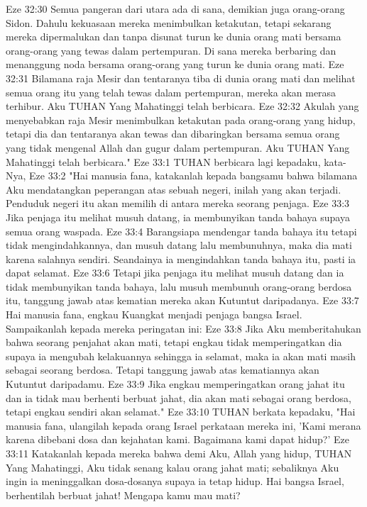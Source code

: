 Eze 32:30  Semua pangeran dari utara ada di sana, demikian juga orang-orang Sidon. Dahulu kekuasaan mereka menimbulkan ketakutan, tetapi sekarang mereka dipermalukan dan tanpa disunat turun ke dunia orang mati bersama orang-orang yang tewas dalam pertempuran. Di sana mereka berbaring dan menanggung noda bersama orang-orang yang turun ke dunia orang mati.
Eze 32:31  Bilamana raja Mesir dan tentaranya tiba di dunia orang mati dan melihat semua orang itu yang telah tewas dalam pertempuran, mereka akan merasa terhibur. Aku TUHAN Yang Mahatinggi telah berbicara.
Eze 32:32  Akulah yang menyebabkan raja Mesir menimbulkan ketakutan pada orang-orang yang hidup, tetapi dia dan tentaranya akan tewas dan dibaringkan bersama semua orang yang tidak mengenal Allah dan gugur dalam pertempuran. Aku TUHAN Yang Mahatinggi telah berbicara."
Eze 33:1  TUHAN berbicara lagi kepadaku, kata-Nya,
Eze 33:2  "Hai manusia fana, katakanlah kepada bangsamu bahwa bilamana Aku mendatangkan peperangan atas sebuah negeri, inilah yang akan terjadi. Penduduk negeri itu akan memilih di antara mereka seorang penjaga.
Eze 33:3  Jika penjaga itu melihat musuh datang, ia membunyikan tanda bahaya supaya semua orang waspada.
Eze 33:4  Barangsiapa mendengar tanda bahaya itu tetapi tidak mengindahkannya, dan musuh datang lalu membunuhnya, maka dia mati karena salahnya sendiri. Seandainya ia mengindahkan tanda bahaya itu, pasti ia dapat selamat.
Eze 33:6  Tetapi jika penjaga itu melihat musuh datang dan ia tidak membunyikan tanda bahaya, lalu musuh membunuh orang-orang berdosa itu, tanggung jawab atas kematian mereka akan Kutuntut daripadanya.
Eze 33:7  Hai manusia fana, engkau Kuangkat menjadi penjaga bangsa Israel. Sampaikanlah kepada mereka peringatan ini:
Eze 33:8  Jika Aku memberitahukan bahwa seorang penjahat akan mati, tetapi engkau tidak memperingatkan dia supaya ia mengubah kelakuannya sehingga ia selamat, maka ia akan mati masih sebagai seorang berdosa. Tetapi tanggung jawab atas kematiannya akan Kutuntut daripadamu.
Eze 33:9  Jika engkau memperingatkan orang jahat itu dan ia tidak mau berhenti berbuat jahat, dia akan mati sebagai orang berdosa, tetapi engkau sendiri akan selamat."
Eze 33:10  TUHAN berkata kepadaku, "Hai manusia fana, ulangilah kepada orang Israel perkataan mereka ini, 'Kami merana karena dibebani dosa dan kejahatan kami. Bagaimana kami dapat hidup?'
Eze 33:11  Katakanlah kepada mereka bahwa demi Aku, Allah yang hidup, TUHAN Yang Mahatinggi, Aku tidak senang kalau orang jahat mati; sebaliknya Aku ingin ia meninggalkan dosa-dosanya supaya ia tetap hidup. Hai bangsa Israel, berhentilah berbuat jahat! Mengapa kamu mau mati?
